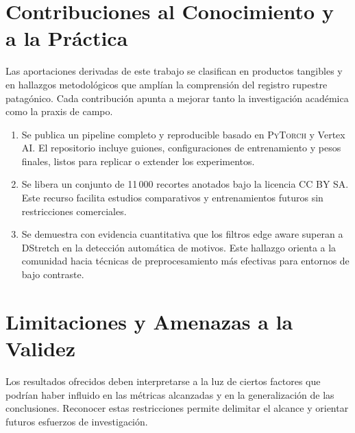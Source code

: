 \section{Contribuciones al Conocimiento y a la Práctica}

Las aportaciones derivadas de este trabajo se clasifican en productos tangibles y en hallazgos metodológicos que amplían la comprensión del registro rupestre patagónico.
Cada contribución apunta a mejorar tanto la investigación académica como la praxis de campo.

\begin{enumerate}
  \item Se publica un pipeline completo y reproducible basado en \textsc{PyTorch} y Vertex AI.
        El repositorio incluye guiones, configuraciones de entrenamiento y pesos finales, listos para replicar o extender los experimentos.

  \item Se libera un conjunto de 11\,000 recortes anotados bajo la licencia CC BY SA.
        Este recurso facilita estudios comparativos y entrenamientos futuros sin restricciones comerciales.

  \item Se demuestra con evidencia cuantitativa que los filtros edge aware superan a DStretch en la detección automática de motivos.
        Este hallazgo orienta a la comunidad hacia técnicas de preprocesamiento más efectivas para entornos de bajo contraste.
\end{enumerate}

\section{Limitaciones y Amenazas a la Validez}

Los resultados ofrecidos deben interpretarse a la luz de ciertos factores que podrían haber influido en las métricas alcanzadas y en la generalización de las conclusiones.
Reconocer estas restricciones permite delimitar el alcance y orientar futuros esfuerzos de investigación.

